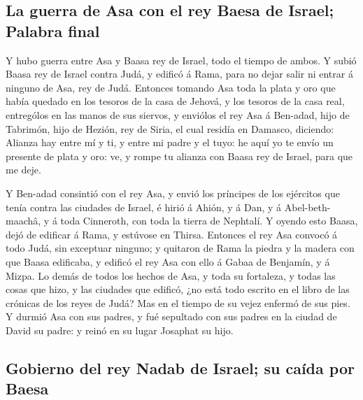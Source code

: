 \hypertarget{la-guerra-de-asa-con-el-rey-baesa-de-israel-palabra-final}{%
\subsection{La guerra de Asa con el rey Baesa de Israel; Palabra
final}\label{la-guerra-de-asa-con-el-rey-baesa-de-israel-palabra-final}}

 Y hubo guerra entre Asa y Baasa rey de Israel, todo el
tiempo de ambos.  Y subió Baasa rey de Israel contra Judá,
y edificó á Rama, para no dejar salir ni entrar á ninguno de Asa, rey de
Judá.  Entonces tomando Asa toda la plata y oro que había
quedado en los tesoros de la casa de Jehová, y los tesoros de la casa
real, entrególos en las manos de sus siervos, y enviólos el rey Asa á
Ben-adad, hijo de Tabrimón, hijo de Hezión, rey de Siria, el cual
residía en Damasco, diciendo:  Alianza hay entre mí y ti, y
entre mi padre y el tuyo: he aquí yo te envío un presente de plata y
oro: ve, y rompe tu alianza con Baasa rey de Israel, para que me deje.

 Y Ben-adad consintió con el rey Asa, y envió los príncipes
de los ejércitos que tenía contra las ciudades de Israel, é hirió á
Ahión, y á Dan, y á Abel-beth-maachâ, y á toda Cinneroth, con toda la
tierra de Nephtalí.  Y oyendo esto Baasa, dejó de edificar
á Rama, y estúvose en Thirsa.  Entonces el rey Asa convocó
á todo Judá, sin exceptuar ninguno; y quitaron de Rama la piedra y la
madera con que Baasa edificaba, y edificó el rey Asa con ello á Gabaa de
Benjamín, y á Mizpa.  Lo demás de todos los hechos de Asa,
y toda su fortaleza, y todas las cosas que hizo, y las ciudades que
edificó, ¿no está todo escrito en el libro de las crónicas de los reyes
de Judá? Mas en el tiempo de su vejez enfermó de sus pies. 
Y durmió Asa con sus padres, y fué sepultado con sus padres en la ciudad
de David su padre: y reinó en su lugar Josaphat su hijo.

\hypertarget{gobierno-del-rey-nadab-de-israel-su-cauxedda-por-baesa}{%
\subsection{Gobierno del rey Nadab de Israel; su caída por
Baesa}\label{gobierno-del-rey-nadab-de-israel-su-cauxedda-por-baesa}}

